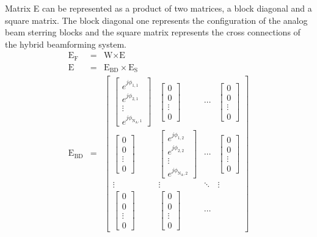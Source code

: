 Matrix E can be represented as a product of two matrices, a block diagonal and a square matrix. The block diagonal one represents the configuration of the analog beam sterring blocks and the square matrix represents the cross connections of the hybrid beamforming system.
\begin{eqnarray}
\text{E}_\text{F} &=& \text{W} \times \text{E} \\
\text{E} &=& \text{E}_\text{BD} \times \text{E}_\text{S} \\
\text{E}_\text{BD} &=& \begin{bmatrix}
\begin{bmatrix} e^{j\phi_{1,1}}\\ e^{j\phi_{2,1}}\\ \vdots \\e^{j\phi_{\text{N}_\text{A},1}}\end{bmatrix} & 
\begin{bmatrix} 0\\ 0\\ \vdots \\0\end{bmatrix} & \cdots & \begin{bmatrix} 0\\ 0\\ \vdots \\0\end{bmatrix} \\
\begin{bmatrix} 0\\ 0\\ \vdots \\0\end{bmatrix} & \begin{bmatrix} e^{j\phi_{1,2}}\\ e^{j\phi_{2,2}}\\ \vdots \\e^{j\phi_{\text{N}_\text{A},2}}\end{bmatrix} & \cdots &
\begin{bmatrix} 0\\ 0\\ \vdots \\0\end{bmatrix} \\
 \vdots & \vdots & \ddots & \vdots  \\
 \begin{bmatrix} 0\\ 0\\ \vdots \\0\end{bmatrix} &  \begin{bmatrix} 0\\ 0\\ \vdots \\0\end{bmatrix} &  \cdots & 

\end{bmatrix}
\end{eqnarray}
